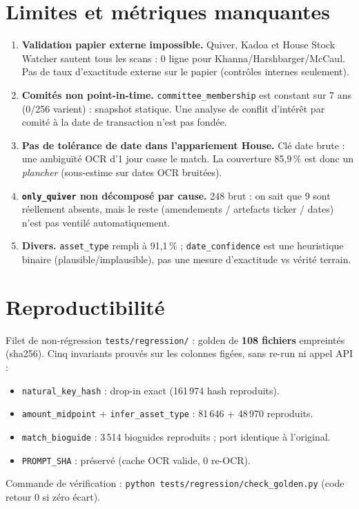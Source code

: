 \documentclass[11pt,a4paper]{article}
\begin{document}
\section{Limites et métriques manquantes}
\begin{enumerate}[nosep,leftmargin=1.5em]
\item \textbf{Validation papier externe impossible.} Quiver, Kadoa et House Stock Watcher sautent tous les scans : 0 ligne pour Khanna/Harshbarger/McCaul. Pas de taux d'exactitude externe sur le papier (contrôles internes seulement).
\item \textbf{Comités non point-in-time.} \texttt{committee\_membership} est constant sur 7 ans (0/256 varient) : snapshot statique. Une analyse de conflit d'intérêt par comité à la date de transaction n'est pas fondée.
\item \textbf{Pas de tolérance de date dans l'appariement House.} Clé date brute : une ambiguïté OCR d'1 jour casse le match. La couverture 85,9\,\% est donc un \emph{plancher} (sous-estime sur dates OCR bruitées).
\item \textbf{\texttt{only\_quiver} non décomposé par cause.} 248 brut : on sait que 9 sont réellement absents, mais le reste (amendements / artefacts ticker / dates) n'est pas ventilé automatiquement.
\item \textbf{Divers.} \texttt{asset\_type} rempli à 91,1\,\% ; \texttt{date\_confidence} est une heuristique binaire (plausible/implausible), pas une mesure d'exactitude vs vérité terrain.
\end{enumerate}

\section{Reproductibilité}
Filet de non-régression \texttt{tests/regression/} : golden de \textbf{108 fichiers} empreintés
(sha256). Cinq invariants prouvés sur les colonnes figées, sans re-run ni appel API :
\begin{itemize}[nosep,leftmargin=1.3em]
\item \texttt{natural\_key\_hash} : drop-in exact (161\,974 hash reproduits).
\item \texttt{amount\_midpoint} + \texttt{infer\_asset\_type} : 81\,646 + 48\,970 reproduits.
\item \texttt{match\_bioguide} : 3\,514 bioguides reproduits ; port identique à l'original.
\item \texttt{PROMPT\_SHA} : préservé (cache OCR valide, 0 re-OCR).
\end{itemize}
Commande de vérification : \texttt{python tests/regression/check\_golden.py} (code retour 0 si zéro écart).
\end{document}
